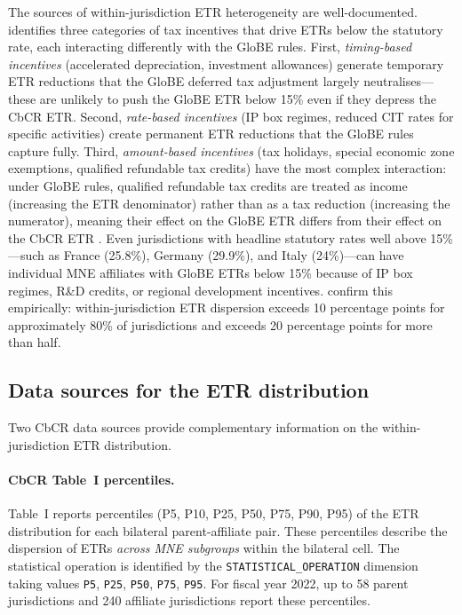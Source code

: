 \documentclass[11pt,a4paper]{article}
\newcommand{\code}[1]{\texttt{#1}}
\begin{document}
The sources of within-jurisdiction ETR heterogeneity are well-documented. \citet{liotti2022} identifies three categories of tax incentives that drive ETRs below the statutory rate, each interacting differently with the GloBE rules. First, \emph{timing-based incentives} (accelerated depreciation, investment allowances) generate temporary ETR reductions that the GloBE deferred tax adjustment largely neutralises---these are unlikely to push the GloBE ETR below 15\% even if they depress the CbCR ETR. Second, \emph{rate-based incentives} (IP box regimes, reduced CIT rates for specific activities) create permanent ETR reductions that the GloBE rules capture fully. Third, \emph{amount-based incentives} (tax holidays, special economic zone exemptions, qualified refundable tax credits) have the most complex interaction: under GloBE rules, qualified refundable tax credits are treated as income (increasing the ETR denominator) rather than as a tax reduction (increasing the numerator), meaning their effect on the GloBE ETR differs from their effect on the CbCR ETR \citep{hanlon2023}. Even jurisdictions with headline statutory rates well above 15\%---such as France (25.8\%), Germany (29.9\%), and Italy (24\%)---can have individual MNE affiliates with GloBE ETRs below 15\% because of IP box regimes, R\&D credits, or regional development incentives. \citet{hugger2025} confirm this empirically: within-jurisdiction ETR dispersion exceeds 10 percentage points for approximately 80\% of jurisdictions and exceeds 20 percentage points for more than half.

\subsection{Data sources for the ETR distribution}\label{sec:etr_dist_data}

Two CbCR data sources provide complementary information on the within-jurisdiction ETR distribution.

\paragraph{CbCR Table~I percentiles.} Table~I reports percentiles (P5, P10, P25, P50, P75, P90, P95) of the ETR distribution for each bilateral parent-affiliate pair. These percentiles describe the dispersion of ETRs \emph{across MNE subgroups} within the bilateral cell. The statistical operation is identified by the \code{STATISTICAL\_OPERATION} dimension taking values \code{P5}, \code{P25}, \code{P50}, \code{P75}, \code{P95}. For fiscal year 2022, up to 58 parent jurisdictions and 240 affiliate jurisdictions report these percentiles.
\end{document}
